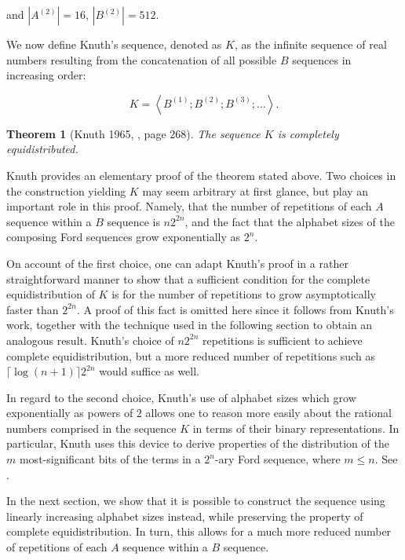 \documentclass[11pt,a4paper]{tesis}
\theoremstyle{plain}
\newtheorem*{theorem*}{Theorem}
\theoremstyle{definition}
\begin{document}
and $|A^{(2)}| = 16$, $|B^{(2)}| = 512$.

We now define Knuth's sequence, denoted as $K$, as the infinite sequence of real numbers resulting from the concatenation of all possible $B$ sequences in increasing order:

\begin{equation*}
  K = \left< B^{(1)} ; B^{(2)} ;  B^{(3)} ; \dots \right> \text{.}
\end{equation*}

\begin{theorem*}[Knuth 1965, \cite{knuth-1965}, page 268]
  The sequence $K$ is completely equidistributed.
\end{theorem*}

Knuth provides an elementary proof of the theorem stated above. Two choices in the construction yielding $K$ may seem arbitrary at first glance, but play an important role in this proof. Namely, that the number of repetitions of each $A$ sequence within a $B$ sequence is $n 2^{2n}$, and the fact that the alphabet sizes of the composing Ford sequences grow exponentially as $2^n$.

On account of the first choice, one can adapt Knuth's proof in a rather straightforward manner to show that a sufficient condition for the complete equidistribution of $K$ is for the number of repetitions to grow asymptotically faster than $2^{2n}$. A proof of this fact is omitted here since it follows from Knuth's work, together with the technique used in the following section to obtain an analogous result. Knuth's choice of $n 2^{2n}$ repetitions is sufficient to achieve complete equidistribution, but a more reduced number of repetitions such as $\lceil \log(n + 1) \rceil 2^{2n}$ would suffice as well.

In regard to the second choice, Knuth's use of alphabet sizes which grow exponentially as powers of $2$ allows one to reason more easily about the rational numbers comprised in the sequence $K$ in terms of their binary representations. In particular, Knuth uses this device to derive properties of the distribution of the $m$ most-significant bits of the terms in a $2^n$-ary Ford sequence, where $m \le n$. See \cite[Lemma 2]{knuth-1965}.

In the next section, we show that it is possible to construct the sequence using linearly increasing alphabet sizes instead, while preserving the property of complete equidistribution. In turn, this allows for a much more reduced number of repetitions of each $A$ sequence within a $B$ sequence.
\end{document}
